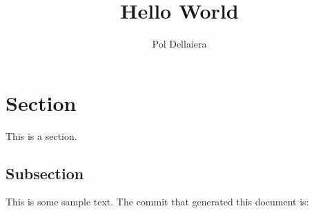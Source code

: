 \documentclass[12pt]{article}
\title{Hello World}
\author{Pol Dellaiera}
\begin{document}
\maketitle
\section{Section}
This is a section.
\subsection{Subsection}
This is some sample text.
The commit that generated this document is: {\gitrevisionsmall}
\end{document}
